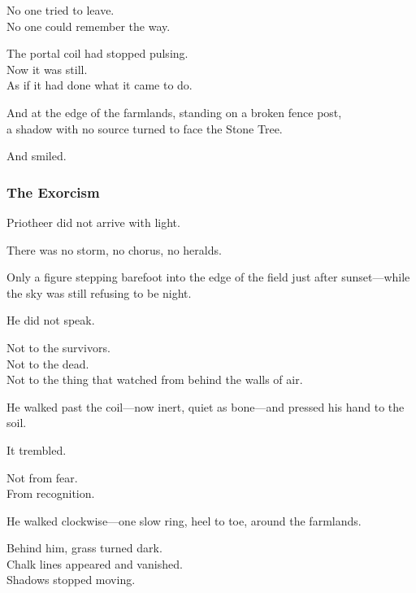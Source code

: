 \documentclass[12pt]{article}
\begin{document}
\vspace{0.5em}
No one tried to leave.\\
No one could remember the way.

\vspace{0.5em}
The portal coil had stopped pulsing.\\
Now it was still.\\
As if it had done what it came to do.

\vspace{0.5em}
And at the edge of the farmlands, standing on a broken fence post,\\
a shadow with no source turned to face the Stone Tree.

\vspace{0.5em}
And smiled.

\dotfill

\subsubsection{The Exorcism}

Priotheer did not arrive with light.

\vspace{0.5em}
There was no storm, no chorus, no heralds.

\vspace{0.5em}
Only a figure stepping barefoot into the edge of the field just after sunset---while the sky was still refusing to be night.

\vspace{0.5em}
He did not speak.

\vspace{0.5em}
Not to the survivors.\\
Not to the dead.\\
Not to the thing that watched from behind the walls of air.

\vspace{0.5em}
He walked past the coil---now inert, quiet as bone---and pressed his hand to the soil.

\vspace{0.5em}
It trembled.

\vspace{0.5em}
Not from fear.\\
From recognition.

\vspace{0.5em}
He walked clockwise---one slow ring, heel to toe, around the farmlands.

\vspace{0.5em}
Behind him, grass turned dark.\\
Chalk lines appeared and vanished.\\
Shadows stopped moving.
\end{document}
